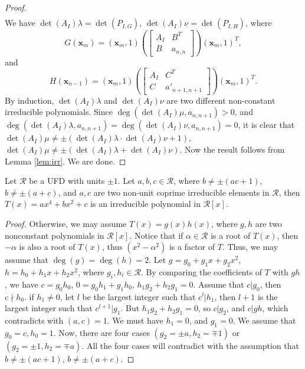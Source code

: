 \documentclass[amsthm]{elsart}
\newcommand{\xx}{\bm{x}}
\begin{document}
\begin{proof}
\begin{align*}
\end{align*}
 We have $ \det(A_I)\lambda=\det(P_{I,G})$, $\det(A_I)\nu=\det(P_{I,H})$, where
  $$G(\xx_m)=(\xx_m,1)\left(\begin{bmatrix} A_I&B^T\\
        B&a_{n,n}\end{bmatrix}\right)(\xx_m,1)^T,$$ and
  $$H(\xx_{n-1})=(\xx_m,1)\left(\begin{bmatrix} A_I&C^T\\
        C&a'_{n+1,n+1}\end{bmatrix}\right)(\xx_m,1)^T. $$
 By induction, $\det(A_I)\lambda$ and $\det(A_I)\nu$ are two different non-constant irreducible polynomials. Since $\deg(\det(A_I)\mu,a_{n,n+1})>0$, and $\deg(\det(A_I)\lambda,a_{n,n+1})=\deg(\det(A_I)\nu,a_{n,n+1})=0$, it is clear that $\det(A_I)\mu\neq \pm (\det(A_I)\lambda\cdot \det(A_I)\nu+1)$, $\det(A_I)\mu\neq \pm (\det(A_I)\lambda+\det(A_I)\nu)$.
 Now the result follows from Lemma \ref{lem:irr}. We are done.
   \end{proof}






\begin{lem} \label{lem:irr}
   Let $\mathcal{R}$ be a UFD with units $\pm1$. Let $a,b,c\in \mathcal{R}$, where $b\neq \pm (ac+1)$, $b\neq \pm (a+c)$, and $a,c$ are two non-unit coprime irreducible elements in $\mathcal{R}$, then $T(x)=ax^4+bx^2+c$ is an irreducible polynomial in $\mathcal{R}[x]$. \begin{proof}
Otherwise, we may assume $T(x)=g(x)h(x)$, where $g,h$ are two nonconstant polynomials in $\mathcal{R}[x]$.
   Notice that if $\alpha\in \mathcal{R}$ is a root of $T(x)$, then $-\alpha$ is also a root of $T(x)$, thus $(x^2-\alpha^2)$ is a factor of $T$. Thus, we may assume that $\deg(g)=\deg(h)=2$. Let $g=g_0+g_1x+g_2x^2$, $h=h_0+h_1x+h_2x^2$, where $g_i,h_i\in\mathcal{R}$.
   By comparing the coefficients of $T$ with $gh$, we have $c=g_0h_0$, $0=g_0h_1+g_1h_0$, $h_1g_2+h_2g_1=0$. Assume that $c|g_0$, then $c\nmid h_0$. if $h_1\neq0$, let $l$ be the largest integer such that $c^l|h_1$, then $l+1$ is the largest integer such that $c^{l+1}|g_1$. But $h_1g_2+h_2g_1=0$, so $c|g_2$, and $c|gh$, which contradicts with $(a,c)=1$. We must have $h_1=0$, and $g_1=0$.
   We assume that $g_0=c,h_0=1$. Now, there are four cases $(g_2=\pm a,h_2=\mp1)$ or $(g_2=\pm1,h_2=\mp a)$. All the four cases will contradict with the assumption that $b\neq \pm (ac+1)$, $b\neq \pm (a+c)$.
   \end{proof}
  \end{lem}
\end{document}

